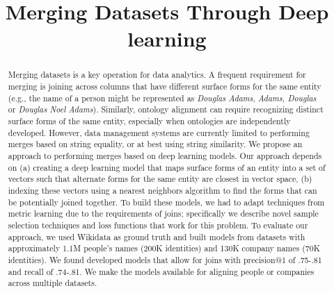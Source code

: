 \documentclass[letterpaper]{article} %
\begin{document}
%
\title{Merging Datasets Through Deep learning}




\maketitle
\begin{abstract}
Merging datasets is a key operation for data analytics.  A frequent
requirement for merging is joining across columns that have
different surface forms for the same entity (e.g., the name of a
person might be represented as \textit{Douglas Adams},
\textit{Adams, Douglas} or \textit{Douglas Noel Adams}).  Similarly,
ontology alignment can require recognizing distinct surface forms of
the same entity, especially when ontologies are independently
developed.  However, data management systems are currently limited
to performing merges based on string equality, or at best using
string similarity.  We propose an approach to performing merges
based on deep learning models.  Our approach depends on (a) creating
a deep learning model that maps surface forms of an entity into a
set of vectors such that alternate forms for the same entity are
closest in vector space, (b) indexing these vectors using a nearest
neighbors algorithm to find the forms that can be potentially joined
together.  To build these models, we had to adapt techniques from
metric learning due to the requirements of joins; specifically we describe 
novel sample selection techniques and loss functions that work for this problem.  
To evaluate our approach, we used Wikidata as ground truth
and built models from datasets with approximately 1.1M people's names
(200K identities) and 130K company names (70K identities).  We found developed models that 
allow for joins with precision@1 of .75-.81 and
recall of .74-.81.  We make the models available for aligning people or companies across multiple datasets.  
\end{abstract}








  
  
  
\end{document}
